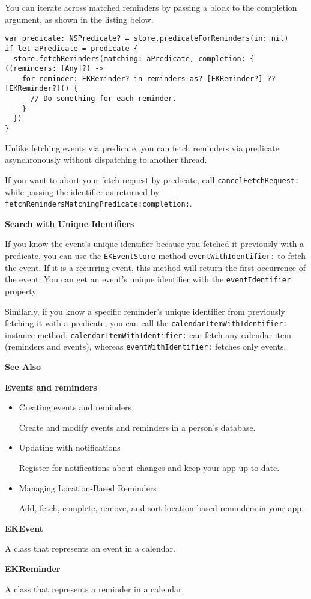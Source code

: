 \documentclass{article}
\begin{document}
You can iterate across matched reminders by passing a block to the completion argument, as shown in the listing below.

\begin{verbatim}
var predicate: NSPredicate? = store.predicateForReminders(in: nil)
if let aPredicate = predicate {
  store.fetchReminders(matching: aPredicate, completion: { ((reminders: [Any]?) ->
    for reminder: EKReminder? in reminders as? [EKReminder?] ?? [EKReminder?]() {
      // Do something for each reminder.
    }
  })
}
\end{verbatim}

Unlike fetching events via predicate, you can fetch reminders via predicate asynchronously without dispatching to another thread.

If you want to abort your fetch request by predicate, call \texttt{cancelFetchRequest:} while passing the identifier as returned by \texttt{fetchRemindersMatchingPredicate:completion:}.

\textbf{Search with Unique Identifiers}

If you know the event's unique identifier because you fetched it previously with a predicate, you can use the \texttt{EKEventStore} method \texttt{eventWithIdentifier:} to fetch the event. If it is a recurring event, this method will return the first occurrence of the event. You can get an event's unique identifier with the \texttt{eventIdentifier} property.

Similarly, if you know a specific reminder's unique identifier from previously fetching it with a predicate, you can call the \texttt{calendarItemWithIdentifier:} instance method. \texttt{calendarItemWithIdentifier:} can fetch any calendar item (reminders and events), whereas \texttt{eventWithIdentifier:} fetches only events.

\textbf{See Also}

\textbf{Events and reminders}

\begin{itemize}
    \item Creating events and reminders

    Create and modify events and reminders in a person's database.
    \item Updating with notifications

    Register for notifications about changes and keep your app up to date.
    \item {} Managing Location-Based Reminders

    Add, fetch, complete, remove, and sort location-based reminders in your app.
\end{itemize}

\textbf{EKEvent}

A class that represents an event in a calendar.

\textbf{EKReminder}

A class that represents a reminder in a calendar.
\newpage
\end{document}
